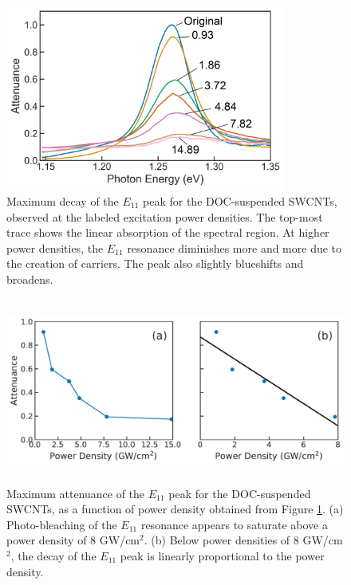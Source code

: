 \begin{figure}[ht]
	\centering
	\includegraphics[height=2.4in]{images/chapter_my_data/Weilu_CNT_abs_max_change_relabeled}
	\caption{Maximum decay of the $E_{11}$ peak for the DOC-suspended SWCNTs, observed at the labeled excitation power densities. The top-most trace shows the linear absorption of the spectral region. At higher power densities, the $E_{11}$ resonance diminishes more and more due to the creation of carriers. The peak also slightly blueshifts and broadens.}
	\label{fig:weilu_cnt_max_decay}
\end{figure}

\begin{figure}[H]
	\centering
	\includegraphics[height=2.4in]{images/chapter_my_data/Weilu_CNT_max_attenuance_and_fit}
	\caption{Maximum attenuance of the $E_{11}$ peak for the DOC-suspended SWCNTs, as a function of power density obtained from Figure \ref{fig:weilu_cnt_max_decay}. (a) Photo-bleaching of the $E_{11}$ resonance appears to saturate above a power density of 8 GW/cm$^2$. (b) Below power densities of 8 GW/cm$^2$, the decay of the $E_{11}$ peak is linearly proportional to the power density.}
	\label{fig:weilu_cnt_max_decay_fit}
\end{figure}

